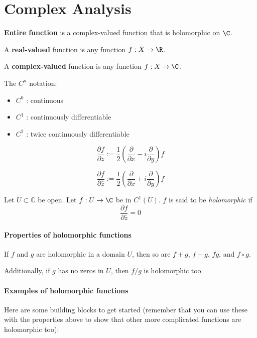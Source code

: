 \section{Complex Analysis}\label{f28d4dc}

\label{d508dc8}

\textbf{Entire function} is a complex-valued function that is holomorphic on $\C$.

A \textbf{real-valued} function is any function $f:X\to\R$.

A \textbf{complex-valued} function is any function $f:X\to\C$.

The $C^n$ notation:
\begin{itemize}
	\item $C^0$ : continuous
	\item $C^1$ : continuously differentiable
	\item $C^2$ : twice continuously differentiable
\end{itemize}

\label{ffea0ed}

$$
	\frac{\partial f}{\partial z} :=
	\frac12\left(
	\frac{\partial}{\partial x}-i\frac{\partial}{\partial y}
	\right)f
$$

$$
	\frac{\partial f}{\partial\bar z} :=
	\frac12\left(
	\frac{\partial}{\partial x}+i\frac{\partial}{\partial y}
	\right)f
$$

\label{e1e08f7}

Let $U\subset\mathbb C$ be open. Let $f:U\to\C$ be in $C^1(U)$. $f$ is
said to be \textit{holomorphic} if
$$
	\frac{\partial f}{\partial\bar z}=0
$$

\paragraph{Properties of holomorphic functions} If $f$ and $g$ are
holomorphic in a domain $U$, then so are $f+g$, $f-g$, $fg$, and
$f\circ g$.

Additionally, if $g$ has no zeros in $U$, then $f/g$ is holomorphic
too.

\paragraph{Examples of holomorphic functions}

Here are some building blocks to get started (remember that you can
use these with the properties above to show that other more
complicated functions are holomorphic too):

